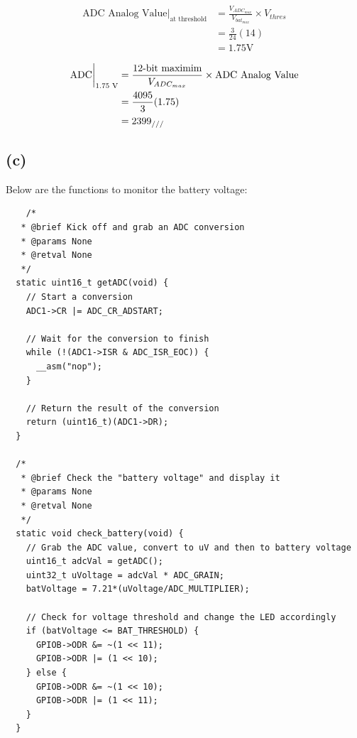 \begin{equation*}
  \begin{split}
    \text{ADC Analog Value} \biggr\rvert_{\text{at threshold}} &= \frac{V_{ADC_{max}}}{V_{bat_{max}}} \times V_{thres}\\
    &= \frac{3}{24} (14)\\
    &= 1.75 \text{V}
  \end{split}
\end{equation*}

\begin{equation*}
  \begin{split}
    \text{ADC}\biggr\rvert_{\text{1.75 V}} &= \frac{\text{12-bit maximim}}{V_{ADC_{max}}} \times \text{ADC Analog Value}\\
    &= \frac{4095}{3} (1.75)\\
    &= 2399 _{\slash \slash \slash}
  \end{split}
\end{equation*}

\subsection*{(c)}
\label{sub:(c)}

Below are the functions to monitor the battery voltage:\\

\begin{verbatim}
    /*
   * @brief Kick off and grab an ADC conversion
   * @params None
   * @retval None
   */
  static uint16_t getADC(void) {
    // Start a conversion
    ADC1->CR |= ADC_CR_ADSTART;

    // Wait for the conversion to finish
    while (!(ADC1->ISR & ADC_ISR_EOC)) {
      __asm("nop");
    }

    // Return the result of the conversion
    return (uint16_t)(ADC1->DR);
  }

  /*
   * @brief Check the "battery voltage" and display it
   * @params None
   * @retval None
   */
  static void check_battery(void) {
    // Grab the ADC value, convert to uV and then to battery voltage
    uint16_t adcVal = getADC();
    uint32_t uVoltage = adcVal * ADC_GRAIN;
    batVoltage = 7.21*(uVoltage/ADC_MULTIPLIER);

    // Check for voltage threshold and change the LED accordingly
    if (batVoltage <= BAT_THRESHOLD) {
      GPIOB->ODR &= ~(1 << 11);
      GPIOB->ODR |= (1 << 10);
    } else {
      GPIOB->ODR &= ~(1 << 10);
      GPIOB->ODR |= (1 << 11);
    }
  }
\end{verbatim}
\vspace{0.5cm}


